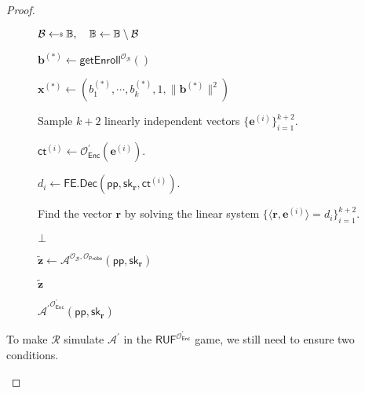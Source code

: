 \begin{proof}
\begin{itemize}
\end{itemize}

\begin{figure}[h]
\centering
	
	\begin{minipage}[t]{0.85\linewidth}
	\centering
	\begin{algorithm}[H]
	\caption{$ {\mathcal{A}^\prime}^{ \mathcal{O}^\prime_{\textsf{Enc}} } (\textsf{pp}, \textsf{sk}_{\mathbf{r}}) $}
	\label{alg:adv:ind-uf-OB-Probe}
	\begin{algorithmic}[1]
		\State $\mathcal{B} \getsdollar \mathbb{B}, \quad \mathbb{B} \gets \mathbb{B} \setminus \mathcal{B}$ \label{alg:adv:ind-uf-OB-Probe:B}
		
		\State $\mathbf{b}^{(*)} \gets \textsf{getEnroll}^{ \mathcal{O}_{\mathcal{B}} } ()$
		
		\State $\mathbf{x}^{(*)} \gets (b_1^{(*)}, \cdots, b_k^{(*)}, 1, \|\mathbf{b}^{(*)}\|^2)$

		\State Sample $k+2$ linearly independent vectors $\{ \mathbf{e}^{(i)} \}_{i=1}^{k+2}$.

			\State $\textsf{ct}^{(i)} \gets \mathcal{O}^\prime_{\textsf{Enc}}(\mathbf{e}^{(i)})$.

			\State $d_i \gets \textsf{FE.Dec}(\textsf{pp}, \textsf{sk}_{\mathbf{r}}, \textsf{ct}^{(i)})$.
		\EndFor

		\State Find the vector $\mathbf{r}$ by solving the linear system $\{ \langle \mathbf{r}, {\mathbf{e}^{(i)}} \rangle = d_i \}_{i=1}^{k+2}$.


			\State \Return $\bot$

		\EndIf

		\State ${\mathbf{\tilde{z}}} \gets \mathcal{A}^{\mathcal{O}_{\mathcal{B}}, \mathcal{O}_{\textsf{Probe}} } (\textsf{pp}, \textsf{sk}_{\mathbf{r}})$
		
		\State \Return ${\mathbf{\tilde{z}}}$
	\end{algorithmic}
	\end{algorithm}
	\end{minipage}
	
\end{figure}

To make $\mathcal{R}$ simulate $\mathcal{A}^\prime$ in the $\textsf{RUF}^{ \mathcal{O}^\prime_{\textsf{Enc}} }$ game, we still need to ensure two conditions.

\begin{itemize}


\end{itemize}
\end{proof}
